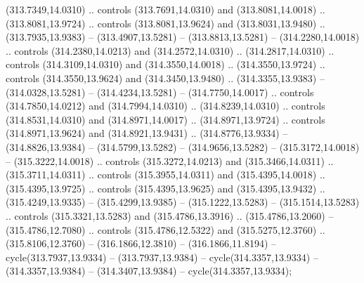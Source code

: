 (313.7349,14.0310) .. controls (313.7691,14.0310) and (313.8081,14.0018) .. (313.8081,13.9724) .. controls (313.8081,13.9624) and (313.8031,13.9480) .. (313.7935,13.9383) -- (313.4907,13.5281) -- (313.8813,13.5281) -- (314.2280,14.0018) .. controls (314.2380,14.0213) and (314.2572,14.0310) .. (314.2817,14.0310) .. controls (314.3109,14.0310) and (314.3550,14.0018) .. (314.3550,13.9724) .. controls (314.3550,13.9624) and (314.3450,13.9480) .. (314.3355,13.9383) -- (314.0328,13.5281) -- (314.4234,13.5281) -- (314.7750,14.0017) .. controls (314.7850,14.0212) and (314.7994,14.0310) .. (314.8239,14.0310) .. controls (314.8531,14.0310) and (314.8971,14.0017) .. (314.8971,13.9724) .. controls (314.8971,13.9624) and (314.8921,13.9431) .. (314.8776,13.9334) -- (314.8826,13.9384) -- (314.5799,13.5282) -- (314.9656,13.5282) -- (315.3172,14.0018) -- (315.3222,14.0018) .. controls (315.3272,14.0213) and (315.3466,14.0311) .. (315.3711,14.0311) .. controls (315.3955,14.0311) and (315.4395,14.0018) .. (315.4395,13.9725) .. controls (315.4395,13.9625) and (315.4395,13.9432) .. (315.4249,13.9335) -- (315.4299,13.9385) -- (315.1222,13.5283) -- (315.1514,13.5283) .. controls (315.3321,13.5283) and (315.4786,13.3916) .. (315.4786,13.2060) -- (315.4786,12.7080) .. controls (315.4786,12.5322) and (315.5275,12.3760) .. (315.8106,12.3760) -- (316.1866,12.3810) -- (316.1866,11.8194) -- cycle(313.7937,13.9334) -- (313.7937,13.9384) -- cycle(314.3357,13.9334) -- (314.3357,13.9384) -- (314.3407,13.9384) -- cycle(314.3357,13.9334);

